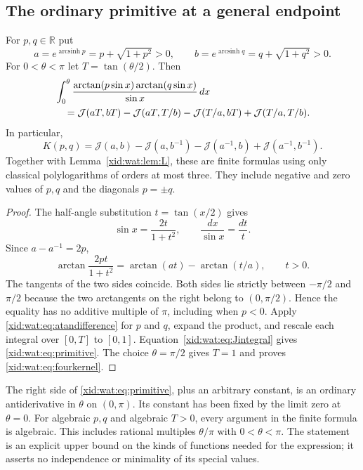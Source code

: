 \subsection{The ordinary primitive at a general endpoint}

\begin{theorem}
\label{xid:wat:thm:primitive}
For $p,q\in\mathbb R$ put
\[
 a=e^{\operatorname{arcsinh}p}=p+\sqrt{1+p^2}>0,
 \qquad
 b=e^{\operatorname{arcsinh}q}=q+\sqrt{1+q^2}>0.
\]
For $0<\theta<\pi$ let $T=\tan(\theta/2)$. Then
\begin{align}\label{xid:wat:eq:primitive}
 &\int_0^\theta
   \frac{\arctan(p\sin x)\arctan(q\sin x)}{\sin x}\,dx
       \notag\\
 &\quad=\mathcal J(aT,bT)-\mathcal J(aT,T/b)
           -\mathcal J(T/a,bT)+\mathcal J(T/a,T/b).
\end{align}
In particular,
\begin{equation}\label{xid:wat:eq:fourkernel}
 \boxed{K(p,q)=\mathcal J(a,b)-\mathcal J(a,b^{-1})
       -\mathcal J(a^{-1},b)+\mathcal J(a^{-1},b^{-1}).}
\end{equation}
Together with Lemma~\ref{xid:wat:lem:L}, these are finite formulas using
only classical polylogarithms of orders at most three. They include
negative and zero values of $p,q$ and the diagonals $p=\pm q$.
\end{theorem}

\begin{proof}
The half-angle substitution $t=\tan(x/2)$ gives
\[
 \sin x=\frac{2t}{1+t^2},\qquad \frac{dx}{\sin x}=\frac{dt}{t}.
\]
Since $a-a^{-1}=2p$,
\begin{equation}\label{xid:wat:eq:atandifference}
 \arctan\frac{2pt}{1+t^2}
       =\arctan(at)-\arctan(t/a),\qquad t>0.
\end{equation}
The tangents of the two sides coincide. Both sides lie strictly
between $-\pi/2$ and $\pi/2$ because the two arctangents on the right
belong to $(0,\pi/2)$. Hence the equality has no additive multiple
of $\pi$, including when $p<0$.
Apply \eqref{xid:wat:eq:atandifference} for $p$ and $q$, expand the
product, and rescale each integral over $[0,T]$ to $[0,1]$.
Equation~\eqref{xid:wat:eq:Jintegral} gives \eqref{xid:wat:eq:primitive}.
The choice $\theta=\pi/2$ gives $T=1$ and proves
\eqref{xid:wat:eq:fourkernel}.
\end{proof}

The right side of \eqref{xid:wat:eq:primitive}, plus an arbitrary constant,
is an ordinary antiderivative in $\theta$ on $(0,\pi)$. Its constant
has been fixed by the limit zero at $\theta=0$. For algebraic $p,q$
and algebraic $T>0$, every argument in the finite formula is algebraic.
This includes rational multiples $\theta/\pi$ with $0<\theta<\pi$.
The statement is an explicit upper bound on the kinds of functions
needed for the expression; it asserts no independence or minimality
of its special values.

